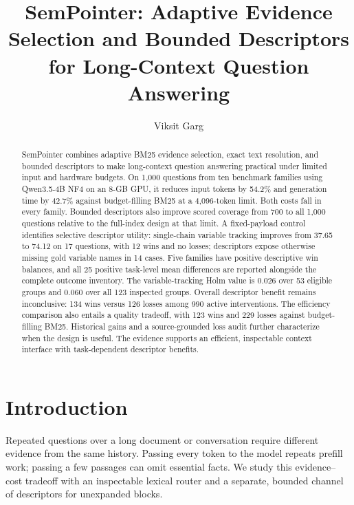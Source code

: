 \documentclass[runningheads]{llncs}
\begin{document}
\raggedbottom
\title{SemPointer: Adaptive Evidence Selection and Bounded Descriptors for Long-Context Question Answering}
\author{Viksit Garg}
\maketitle

\begin{abstract}
SemPointer combines adaptive BM25 evidence selection, exact text resolution, and bounded descriptors to make long-context question answering practical under limited input and hardware budgets. On 1,000 questions from ten benchmark families using Qwen3.5-4B NF4 on an 8-GB GPU, it reduces input tokens by 54.2\% and generation time by 42.7\% against budget-filling BM25 at a 4,096-token limit. Both costs fall in every family. Bounded descriptors also improve scored coverage from 700 to all 1,000 questions relative to the full-index design at that limit. A fixed-payload control identifies selective descriptor utility: single-chain variable tracking improves from 37.65 to 74.12 on 17 questions, with 12 wins and no losses; descriptors expose otherwise missing gold variable names in 14 cases. Five families have positive descriptive win balances, and all 25 positive task-level mean differences are reported alongside the complete outcome inventory. The variable-tracking Holm value is 0.026 over 53 eligible groups and 0.060 over all 123 inspected groups. Overall descriptor benefit remains inconclusive: 134 wins versus 126 losses among 990 active interventions. The efficiency comparison also entails a quality tradeoff, with 123 wins and 229 losses against budget-filling BM25. Historical gains and a source-grounded loss audit further characterize when the design is useful. The evidence supports an efficient, inspectable context interface with task-dependent descriptor benefits.
\end{abstract}

\section{Introduction}
Repeated questions over a long document or conversation require different evidence from the same history. Passing every token to the model repeats prefill work; passing a few passages can omit essential facts. We study this evidence--cost tradeoff with an inspectable lexical router and a separate, bounded channel of descriptors for unexpanded blocks.
\end{document}
